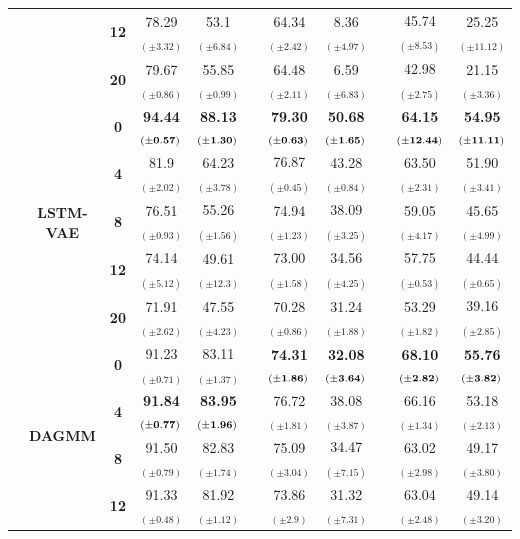 \begin{table}[ht!]
\begin{tabular*}{\textwidth}{@{\extracolsep{\fill}} lcc  cc c cc c cc}
                                & & \bf 12 & 78.29$_{(\pm3.32)}$ & 53.1$_{(\pm6.84)}$ & & 64.34$_{(\pm2.42)}$ & 8.36$_{(\pm4.97)}$ & & 45.74$_{(\pm8.53)}$ & 25.25$_{(\pm11.12)}$  \\
                                & & \bf 20 & 79.67$_{(\pm0.86)}$ & 55.85$_{(\pm0.99)}$ & & 64.48$_{(\pm2.11)}$ & 6.59$_{(\pm6.83)}$ & & 42.98$_{(\pm2.75)}$ & 21.15$_{(\pm3.36)}$  \\
    \addlinespace    
    \cmidrule{2-11}
        & \multirow{5}{*}{\bf LSTM-VAE} & \bf 0 & \bf 94.44$_{\bf(\pm0.57)}$ & \bf 88.13$_{\bf(\pm1.30)}$ & & \bf 79.30$_{\bf(\pm0.63)}$ & \bf 50.68$_{\bf(\pm1.65)}$ & & \bf 64.15$_{\bf(\pm12.44)}$ &\bf 54.95$_{\bf(\pm11.11)}$  \\
                                & & \bf 4 & 81.9$_{(\pm2.02)}$ & 64.23$_{(\pm3.78)}$ & & 76.87$_{(\pm0.45)}$ & 43.28$_{(\pm0.84)}$ & & 63.50$_{(\pm2.31)}$ & 51.90$_{(\pm3.41)}$ \\
                                & & \bf 8 & 76.51$_{(\pm0.93)}$ & 55.26$_{(\pm1.56)}$ & & 74.94$_{(\pm1.23)}$ & 38.09$_{(\pm3.25)}$ & & 59.05$_{(\pm4.17)}$ & 45.65$_{(\pm4.99)}$ \\
                                & & \bf 12 & 74.14$_{(\pm5.12)}$ & 49.61$_{(\pm12.3)}$ & & 73.00$_{(\pm1.58)}$ & 34.56$_{(\pm4.25)}$ & & 57.75$_{(\pm0.53)}$ & 44.44$_{(\pm0.65)}$  \\
                                & & \bf 20 & 71.91$_{(\pm2.62)}$ & 47.55$_{(\pm4.23)}$ & & 70.28$_{(\pm0.86)}$ & 31.24$_{(\pm1.88)}$  & & 53.29$_{(\pm1.82)}$ & 39.16$_{(\pm2.85)}$  \\
    \addlinespace    
    \cmidrule{2-11}
        & \multirow{5}{*}{\bf DAGMM} & \bf 0 & 91.23$_{(\pm0.71)}$ & 83.11$_{(\pm1.37)}$ & & \bf 74.31$_{\bf(\pm1.86)}$ & \bf 32.08$_{\bf(\pm3.64)}$ & & \bf 68.10$_{\bf(\pm2.82)}$ & \bf 55.76$_{\bf(\pm3.82)}$  \\
                                & & \bf 4 & \bf 91.84$_{\bf(\pm0.77)}$ & \bf 83.95$_{\bf(\pm1.96)}$ & & 76.72$_{(\pm1.81)}$ & 38.08$_{(\pm3.87)}$ & & 66.16$_{(\pm1.34)}$ & 53.18$_{(\pm2.13)}$ \\
                                & & \bf 8 & 91.50$_{(\pm0.79)}$ & 82.83$_{(\pm1.74)}$ & & 75.09$_{(\pm3.04)}$ & 34.47$_{(\pm7.15)}$ & & 63.02$_{(\pm2.98)}$ & 49.17$_{(\pm3.80)}$ \\
                                & & \bf 12 & 91.33$_{(\pm0.48)}$ & 81.92$_{(\pm1.12)}$ & & 73.86$_{(\pm2.9)}$ & 31.32$_{(\pm7.31)}$ & & 63.04$_{(\pm2.48)}$ & 49.14$_{(\pm3.20)}$  \\

\end{tabular*}
\end{table}
